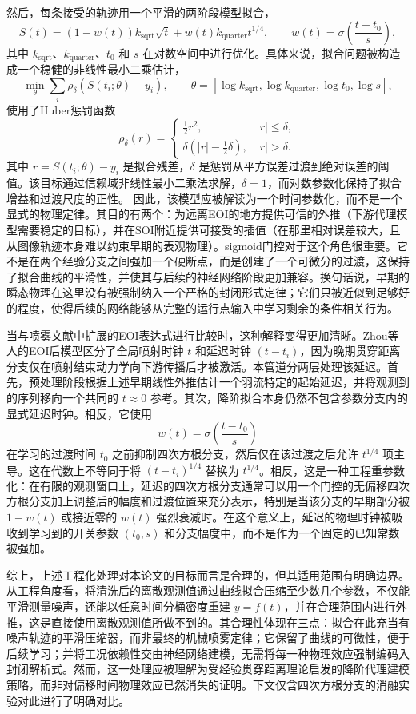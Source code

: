 然后，每条接受的轨迹用一个平滑的两阶段模型拟合，
\[
S(t)=\left(1-w(t)\right)k_{\mathrm{sqrt}}\sqrt{t}
+w(t)k_{\mathrm{quarter}}t^{1/4},
\qquad
w(t)=\sigma\!\left(\frac{t-t_0}{s}\right),
\]
其中 \(k_{\mathrm{sqrt}}\)、\(k_{\mathrm{quarter}}\)、\(t_0\) 和 \(s\) 在对数空间中进行优化。具体来说，拟合问题被构造成一个稳健的非线性最小二乘估计，
\[
\min_{\theta}
\sum_i \rho_\delta\!\left(S(t_i;\theta)-y_i\right),
\qquad
\theta=
\left[\log k_{\mathrm{sqrt}},\log k_{\mathrm{quarter}},\log t_0,\log s\right],
\]
使用了Huber惩罚函数
\[
\rho_\delta(r)=
\begin{cases}
\tfrac{1}{2}r^2, & |r|\le \delta,\\
\delta\left(|r|-\tfrac{1}{2}\delta\right), & |r|>\delta.
\end{cases}
\]
其中 \(r = S(t_i;\theta)-y_i\) 是拟合残差，\(\delta\) 是惩罚从平方误差过渡到绝对误差的阈值。该目标通过信赖域非线性最小二乘法求解，\(\delta=1\)，而对数参数化保持了拟合增益和过渡尺度的正性\cite{Huber1964,NocedalWright2006}。
因此，该模型应被解读为一个时间参数化，而不是一个显式的物理定律。其目的有两个：为远离EOI的地方提供可信的外推（下游代理模型需要稳定的目标），并在SOI附近提供可接受的插值（在那里相对误差较大，且从图像轨迹本身难以约束早期的表观物理）。sigmoid门控对于这个角色很重要。它不是在两个经验分支之间强加一个硬断点，而是创建了一个可微分的过渡，这保持了拟合曲线的平滑性，并使其与后续的神经网络阶段更加兼容。换句话说，早期的瞬态物理在这里没有被强制纳入一个严格的封闭形式定律；它们只被近似到足够好的程度，使得后续的网络能够从完整的运行点输入中学习剩余的条件相关行为。

当与喷雾文献中扩展的EOI表达式进行比较时，这种解释变得更加清晰。Zhou等人的EOI后模型区分了全局喷射时钟 \(t\) 和延迟时钟 \((t-t_i)\)，因为晚期贯穿距离分支仅在喷射结束动力学向下游传播后才被激活\cite{ZhouLiLaiWei2019}。本管道分两层处理该延迟。首先，预处理阶段根据上述早期线性外推估计一个羽流特定的起始延迟，并将观测到的序列移向一个共同的 \(t\approx 0\) 参考。其次，降阶拟合本身仍然不包含参数分支内的显式延迟时钟。相反，它使用
\[
w(t)=\sigma\!\left(\frac{t-t_0}{s}\right)
\]
在学习的过渡时间 \(t_0\) 之前抑制四次方根分支，然后仅在该过渡之后允许 \(t^{1/4}\) 项主导。这在代数上不等同于将 \((t-t_i)^{1/4}\) 替换为 \(t^{1/4}\)。相反，这是一种工程重参数化：在有限的观测窗口上，延迟的四次方根分支通常可以用一个门控的无偏移四次方根分支加上调整后的幅度和过渡位置来充分表示，特别是当该分支的早期部分被 \(1-w(t)\) 或接近零的 \(w(t)\) 强烈衰减时。在这个意义上，延迟的物理时钟被吸收到学习到的开关参数 \((t_0,s)\) 和分支幅度中，而不是作为一个固定的已知常数被强加。

综上，上述工程化处理对本论文的目标而言是合理的，但其适用范围有明确边界。从工程角度看，将清洗后的离散观测值通过曲线拟合压缩至少数几个参数，不仅能平滑测量噪声，还能以任意时间分桶密度重建 $y = f(t)$，并在合理范围内进行外推，这是直接使用离散观测值所做不到的。其合理性体现在三点：拟合在此充当有噪声轨迹的平滑压缩器，而非最终的机械喷雾定律；它保留了曲线的可微性，便于后续学习；并将工况依赖性交由神经网络建模，无需将每一种物理效应强制编码入封闭解析式。然而，这一处理应被理解为受经验贯穿距离理论启发的降阶代理建模策略，而非对偏移时间物理效应已然消失的证明。下文仅含四次方根分支的消融实验对此进行了明确对比。

